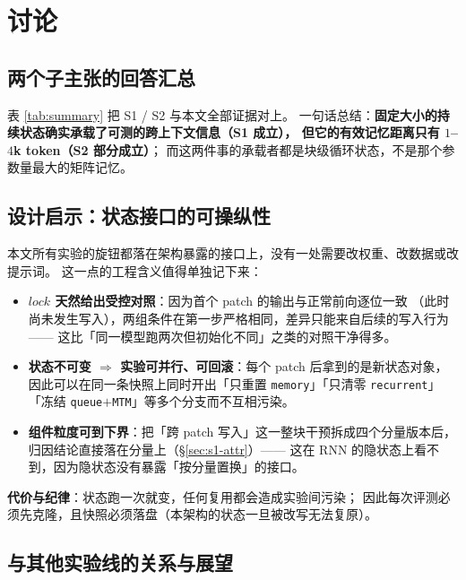 \section{讨论}\label{sec:discussion}

\subsection{两个子主张的回答汇总}\label{sec:disc-summary}

表 \ref{tab:summary} 把 S1 / S2 与本文全部证据对上。
一句话总结：\textbf{固定大小的持续状态确实承载了可测的跨上下文信息（S1 成立），
但它的有效记忆距离只有 $1$--$4$k token（S2 部分成立）}；
而这两件事的承载者都是块级循环状态，不是那个参数量最大的矩阵记忆。



\subsection{设计启示：状态接口的可操纵性}\label{sec:disc-design}

本文所有实验的旋钮都落在架构暴露的接口上，没有一处需要改权重、改数据或改提示词。
这一点的工程含义值得单独记下来：

\begin{itemize}\itemsep3pt
\item \textbf{$\mathit{lock}$ 天然给出受控对照}：因为首个 patch 的输出与正常前向逐位一致
（此时尚未发生写入），两组条件在第一步严格相同，差异只能来自后续的写入行为——
这比「同一模型跑两次但初始化不同」之类的对照干净得多。
\item \textbf{状态不可变 $\Rightarrow$ 实验可并行、可回滚}：每个 patch 后拿到的是新状态对象，
因此可以在同一条快照上同时开出「只重置 \texttt{memory}」「只清零 \texttt{recurrent}」
「冻结 \texttt{queue}$+$\texttt{MTM}」等多个分支而不互相污染。
\item \textbf{组件粒度可到下界}：把「跨 patch 写入」这一整块干预拆成四个分量版本后，
归因结论直接落在分量上（\S\ref{sec:s1-attr}）——
这在 RNN 的隐状态上看不到，因为隐状态没有暴露「按分量置换」的接口。
\end{itemize}

\textbf{代价与纪律}：状态跑一次就变，任何复用都会造成实验间污染；
因此每次评测必须先克隆，且快照必须落盘（本架构的状态一旦被改写无法复原）。

\subsection{与其他实验线的关系与展望}\label{sec:disc-rest}

